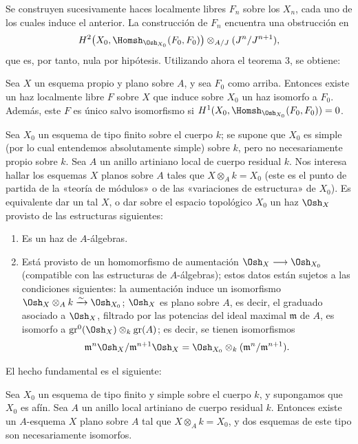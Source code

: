 Se construyen sucesivamente haces localmente libres $F_n$ sobre los $X_n$, cada
uno de los cuales induce el anterior. La construcción de $F_n$ encuentra una
obstrucción en
\[
  H^2\bigl(X_0,\Homsh_{\Osh_{X_0}}(F_0,F_0)\bigr)
  \otimes_{A/J}(J^n/J^{n+1}),
\]
que es, por tanto, nula por hipótesis. Utilizando ahora el teorema 3, se
obtiene:

 Sea $X$ un esquema propio y plano sobre $A$, y sea $F_0$
como arriba. Entonces existe un haz localmente libre $F$ sobre $X$ que induce
sobre $X_0$ un haz isomorfo a $F_0$. Además, este $F$ es único salvo
isomorfismo si
$H^1(X_0,\Homsh_{\Osh_{X_0}}(F_0,F_0))=0$.

Sea $X_0$ un esquema de tipo finito sobre el cuerpo $k$; se supone que $X_0$ es
simple (por lo cual entendemos absolutamente simple) sobre $k$, pero no
necesariamente propio sobre $k$. Sea $A$ un anillo artiniano local de cuerpo
residual $k$. Nos interesa hallar los esquemas $X$ planos sobre $A$ tales que
$X\otimes_A k=X_0$ (este es el punto de partida de la «teoría de módulos» o de
las «variaciones de estructura» de $X_0$). Es equivalente dar un tal $X$, o dar
sobre el espacio topológico $X_0$ un haz $\Osh_X$ provisto de las estructuras
siguientes:
\begin{enumerate}
  \item[\textit{i.}] Es un haz de $A$-álgebras.
  \item[\textit{ii.}] Está provisto de un homomorfismo de aumentación
    $\Osh_X\longrightarrow\Osh_{X_0}$ (compatible con las estructuras de
    $A$-álgebras); estos datos están sujetos a las condiciones siguientes: la
    aumentación induce un isomorfismo
    $\Osh_X\otimes_A k\xrightarrow{\sim}\Osh_{X_0}$; $\Osh_X$ es plano sobre
    $A$, es decir, el graduado asociado a $\Osh_X$, filtrado por las potencias
    del ideal maximal $\mathfrak m$ de $A$, es isomorfo a
    $\operatorname{gr}^0(\Osh_X)\otimes_k\operatorname{gr}(A)$; es decir, se
    tienen isomorfismos
    \[
      \mathfrak m^n\Osh_X/\mathfrak m^{n+1}\Osh_X
      =\Osh_{X_0}\otimes_k(\mathfrak m^n/\mathfrak m^{n+1}).
    \]
\end{enumerate}
El hecho fundamental es el siguiente:

 Sea $X_0$ un esquema de tipo finito y simple sobre el
cuerpo $k$, y supongamos que $X_0$ es afín. Sea $A$ un anillo local artiniano de
cuerpo residual $k$. Entonces existe un $A$-esquema $X$ plano sobre $A$ tal que
$X\otimes_A k=X_0$, y dos esquemas de este tipo son necesariamente isomorfos.

